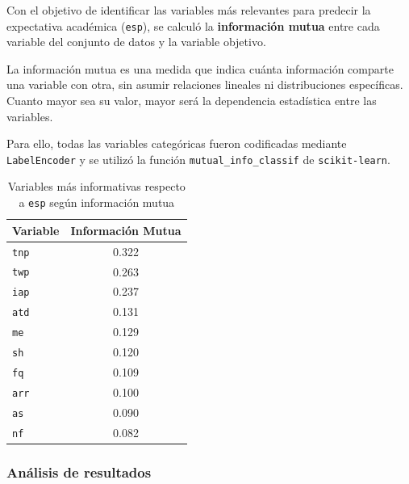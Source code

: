 \documentclass[11pt,a4paper]{article}
\begin{document}
Con el objetivo de identificar las variables más relevantes para predecir la expectativa académica (\texttt{esp}), se calculó la \textbf{información mutua} entre cada variable del conjunto de datos y la variable objetivo.

\medskip

La información mutua es una medida que indica cuánta información comparte una variable con otra, sin asumir relaciones lineales ni distribuciones específicas. Cuanto mayor sea su valor, mayor será la dependencia estadística entre las variables.

\medskip

Para ello, todas las variables categóricas fueron codificadas mediante \texttt{LabelEncoder} y se utilizó la función \texttt{mutual\_info\_classif} de \texttt{scikit-learn}.
\begin{table}[H]
\centering
\scriptsize
\setlength{\tabcolsep}{6pt}
\begin{tabular}{lc}
\toprule
\textbf{Variable} & \textbf{Información Mutua} \\
\midrule
\texttt{tnp} & 0.322 \\
\texttt{twp} & 0.263 \\
\texttt{iap} & 0.237 \\
\texttt{atd} & 0.131 \\
\texttt{me}  & 0.129 \\
\texttt{sh}  & 0.120 \\
\texttt{fq}  & 0.109 \\
\texttt{arr} & 0.100 \\
\texttt{as}  & 0.090 \\
\texttt{nf}  & 0.082 \\
\bottomrule
\end{tabular}
\caption*{Variables más informativas respecto a \texttt{esp} según información mutua}
\end{table}

\medskip

\subsubsection*{Análisis de resultados}
\end{document}
